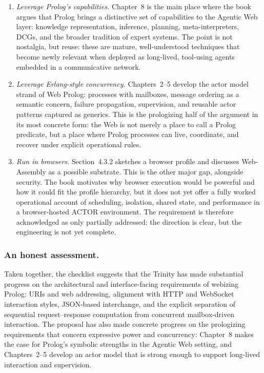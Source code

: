 \begin{enumerate}
\item \emph{Leverage Prolog's capabilities.} Chapter~8 is the main place where the book argues that Prolog brings a distinctive set of capabilities to the Agentic Web layer: knowledge representation, inference, planning, meta-interpreters, DCGs, and the broader tradition of expert systems. The point is not nostalgia, but reuse: these are mature, well-understood techniques that become newly relevant when deployed as long-lived, tool-using agents embedded in a communicative network.
\item \emph{Leverage Erlang-style concurrency.} Chapters~2--5 develop the actor model strand of Web Prolog: processes with mailboxes, message ordering as a semantic concern, failure propagation, supervision, and reusable actor patterns captured as generics. This is the prologizing half of the argument in its most concrete form: the Web is not merely a place to call a Prolog predicate, but a place where Prolog processes can live, coordinate, and recover under explicit operational rules.
\item \emph{Run in browsers.} Section~4.3.2 sketches a browser profile and discusses Web-Assembly as a possible substrate. This is the other major gap, alongside security. The book motivates why browser execution would be powerful and how it could fit the profile hierarchy, but it does not yet offer a fully worked operational account of scheduling, isolation, shared state, and performance in a browser-hosted ACTOR environment. The requirement is therefore acknowledged as only partially addressed: the direction is clear, but the engineering is not yet complete.
\end{enumerate}

\subsubsection{An honest assessment.}
Taken together, the checklist suggests that the Trinity has made substantial progress on the architectural and interface-facing requirements of webizing Prolog: URIs and web addressing, alignment with HTTP and WebSocket interaction styles, JSON-based interchange, and the explicit separation of sequential request--response computation from concurrent mailbox-driven interaction. The proposal has also made concrete progress on the prologizing requirements that concern expressive power and concurrency: Chapter~8 makes the case for Prolog's symbolic strengths in the Agentic Web setting, and Chapters~2--5 develop an actor model that is strong enough to support long-lived interaction and supervision.

